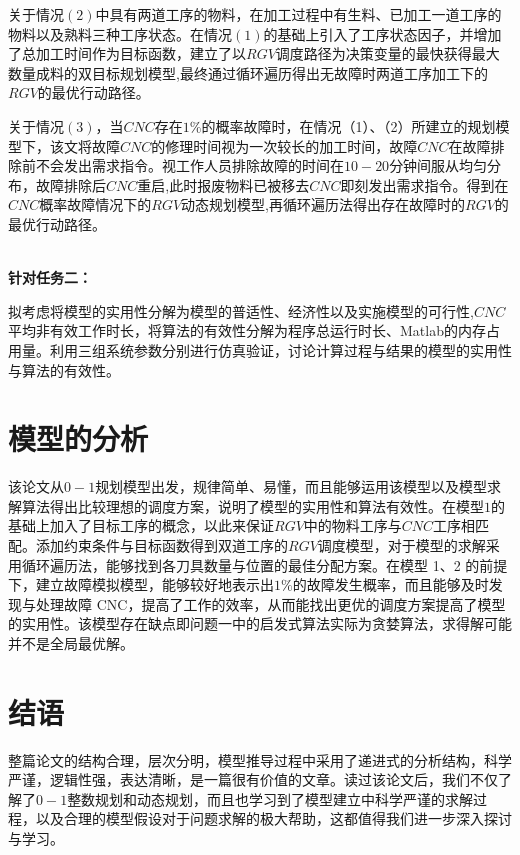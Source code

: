 \documentclass{whutmod}
\begin{document}
	关于情况$(2)$中具有两道工序的物料，在加工过程中有生料、已加工一道工序的物料以及熟料三种工序状态。在情况$(1)$的基础上引入了工序状态因子，并增加了总加工时间作为目标函数，建立了以$RGV$调度路径为决策变量的最快获得最大数量成料的双目标规划模型,最终通过循环遍历得出无故障时两道工序加工下的$RGV$的最优行动路径。
	
	
	关于情况$(3)$，当$CNC$存在$1\%$的概率故障时，在情况（1）、（2）所建立的规划模型下，该文将故障$CNC$的修理时间视为一次较长的加工时间，故障$CNC$在故障排除前不会发出需求指令。视工作人员排除故障的时间在$10-20$分钟间服从均匀分布，故障排除后$CNC$重启,此时报废物料已被移去$CNC$即刻发出需求指令。得到在$CNC$概率故障情况下的$RGV$动态规划模型,再循环遍历法得出存在故障时的$RGV$的最优行动路径。
	
	~\\
	\textbf{针对任务二：}
	
	拟考虑将模型的实用性分解为模型的普适性、经济性以及实施模型的可行性,$CNC$平均非有效工作时长，将算法的有效性分解为程序总运行时长、Matlab的内存占用量。利用三组系统参数分别进行仿真验证，讨论计算过程与结果的模型的实用性与算法的有效性。
	
	\section{模型的分析}
	该论文从$0-1$规划模型出发，规律简单、易懂，而且能够运用该模型以及模型求解算法得出比较理想的调度方案，说明了模型的实用性和算法有效性。在模型$1$的基础上加入了目标工序的概念，以此来保证$RGV$中的物料工序与$CNC$工序相匹配。添加约束条件与目标函数得到双道工序的$RGV$调度模型，对于模型的求解采用循环遍历法，能够找到各刀具数量与位置的最佳分配方案。在模型 1、2 的前提下，建立故障模拟模型，能够较好地表示出$1\%$的故障发生概率，而且能够及时发现与处理故障 CNC，提高了工作的效率，从而能找出更优的调度方案提高了模型的实用性。该模型存在缺点即问题一中的启发式算法实际为贪婪算法，求得解可能并不是全局最优解。
	
	
	\section{结语}
	整篇论文的结构合理，层次分明，模型推导过程中采用了递进式的分析结构，科学严谨，逻辑性强，表达清晰，是一篇很有价值的文章。读过该论文后，我们不仅了解了$0-1$整数规划和动态规划，而且也学习到了模型建立中科学严谨的求解过程，以及合理的模型假设对于问题求解的极大帮助，这都值得我们进一步深入探讨与学习。
\end{document}

